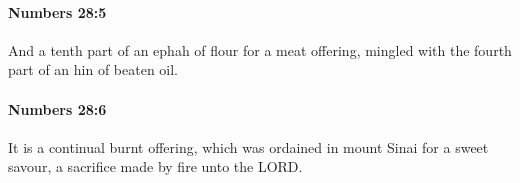 		\paragraph{Numbers 28:5} %
			\label{NUMBERS-28-5}

			And a tenth part of an ephah of flour for a meat offering, mingled with the fourth part of an hin of beaten oil.


		\paragraph{Numbers 28:6} %
			\label{NUMBERS-28-6}

			It is a continual burnt offering, which was ordained in mount Sinai for a sweet savour, a sacrifice made by fire unto the LORD.


